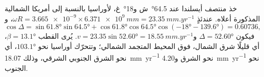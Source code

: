 \begin{example}\label{ex:b1:plate-kinematics:iceland}
خذ منتصف أيسلندا عند \ang{64.5}~ش و\ang{18}~غ،  لأوراسيا بالنسبة إلى أمريكا الشمالية المذكورة أعلاه. عندئذٍ $\omega R =
\num{3.665e-9}\times\qty{6.371e9}{mm} = \qty{23.35}{mm.yr^{-1}}$، و
\[
  \cos\Delta = \sin\ang{61.8}\sin\ang{64.5}
  + \cos\ang{61.8}\cos\ang{64.5}\cos(\ang{-18} - \ang{139.6}) = 0.60736,
\]
فيكون $\Delta = \ang{52.60}$ و$v = 23.35\sin\ang{52.60} = \qty{18.55}{mm.yr^{-1}}$.
يُرى القطب  $\beta = \ang{13.1}$، أي قليلًا شرق الشمال، فوق المحيط المتجمد الشمالي؛ وتتحرّك أوراسيا نحو $\ang{103.1}$، أي نحو الشرق الجنوبي الشرقي، وذلك \qty{18.07}{mm.yr^{-1}} نحو الشرق و\qty{4.20}{mm.yr^{-1}} نحو الجنوب.
\end{example}

